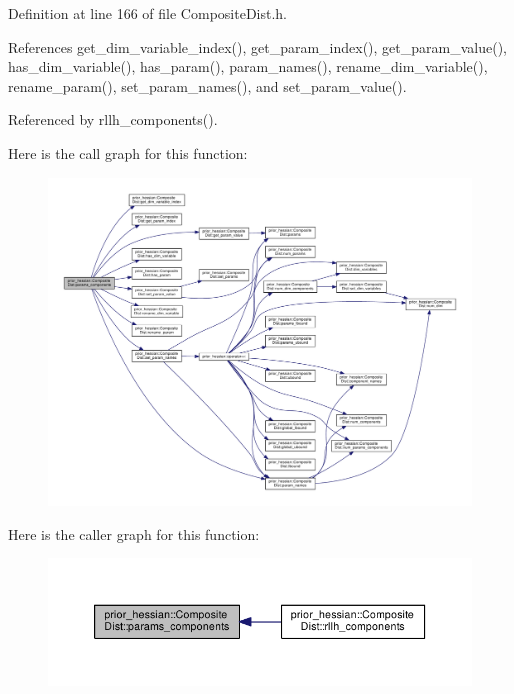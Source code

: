 Definition at line 166 of file Composite\+Dist.\+h.



References get\+\_\+dim\+\_\+variable\+\_\+index(), get\+\_\+param\+\_\+index(), get\+\_\+param\+\_\+value(), has\+\_\+dim\+\_\+variable(), has\+\_\+param(), param\+\_\+names(), rename\+\_\+dim\+\_\+variable(), rename\+\_\+param(), set\+\_\+param\+\_\+names(), and set\+\_\+param\+\_\+value().



Referenced by rllh\+\_\+components().



Here is the call graph for this function\+:\nopagebreak
\begin{figure}[H]
\begin{center}
\leavevmode
\includegraphics[width=350pt]{classprior__hessian_1_1CompositeDist_a927fed39b2b4e87714c728d6e7b11e8b_cgraph}
\end{center}
\end{figure}




Here is the caller graph for this function\+:\nopagebreak
\begin{figure}[H]
\begin{center}
\leavevmode
\includegraphics[width=350pt]{classprior__hessian_1_1CompositeDist_a927fed39b2b4e87714c728d6e7b11e8b_icgraph}
\end{center}
\end{figure}


